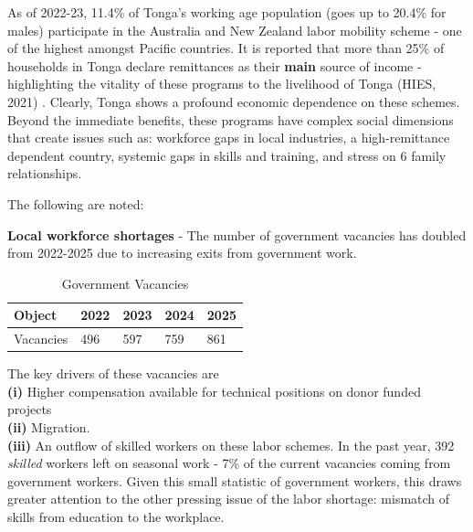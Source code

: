 \documentclass[9pt,a4paper,twocolumn,twoside]{tau-class/tau}
\begin{document}
    As of 2022-23, 11.4\% of Tonga's working age population (goes up to 20.4\% for males) participate in the Australia and New Zealand labor mobility scheme - one of the highest amongst Pacific countries. It is reported that more than 25\% of households in Tonga declare remittances as their \textbf{main} source of income - highlighting the vitality of these programs to the livelihood of Tonga (HIES, 2021) \cite{HIES}. Clearly, Tonga shows a profound economic dependence on these schemes. Beyond the immediate benefits, these programs have complex social dimensions that create issues such as: workforce gaps in local industries, a high-remittance dependent country, systemic gaps in skills and training, and stress on 6 family relationships. 
    
    The following are noted:

   \textbf{Local workforce shortages} - 
   The number of government vacancies has doubled from 2022-2025 due to increasing exits from government work.

	        \begin{table}[H]
            \centering
            \caption{Government Vacancies}
            \label{tab:table}
            \begin{tabular}{lllll}
                \toprule
                \textbf{Object} & \textbf{2022}& \textbf{2023}& \textbf{2024} & \textbf{2025}
                \\
                \midrule
                Vacancies & 496 & 597 & 759 & 861 \\
                \bottomrule     
            \end{tabular}
			
			
        \end{table}
 The key drivers of these vacancies are \\ \textbf{(i)} Higher compensation available for technical positions on donor funded projects \\ \textbf{(ii)} Migration. \\
 \textbf{(iii)} An outflow of skilled workers on these labor schemes. In the past year, 392 \textit{skilled } workers left on seasonal work - 7\% of the current vacancies coming from government workers. Given this small statistic of government workers, this draws greater attention to the other pressing issue of the labor shortage: mismatch of skills from education to the workplace.
 
\end{document}
